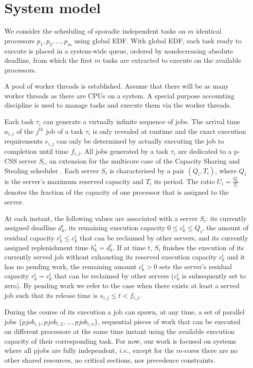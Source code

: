 \documentclass[10pt,twocolumn]{article}
\begin{document}
\section{System model}

We consider the scheduling of sporadic independent tasks on $m$ identical processors ${p_1, p_2, \ldots, p_m}$ using global EDF. With global EDF, each task ready to execute is placed in a system-wide queue, ordered by nondecreasing absolute deadline, from which the first $m$ tasks are extracted to execute on the available processors. 

A pool of worker threads is established. Assume that there will be as many worker threads as there are CPUs on a system. A special purpose accounting discipline is used to manage tasks and execute them via the worker threads.

Each task $\tau_i$ can generate a virtually infinite sequence of jobs. The arrival time $a_{i,j}$ of the $j^{th}$ job of a task $\tau_i$ is only revealed at runtime and the exact execution requirements $e_{i,j}$ can only be determined by actually executing the job to completion until time $f_{i,j}$. All jobs generated by a task $\tau_i$ are dedicated to a p-CSS server $S_i$, an extension for the multicore case of the Capacity Sharing and Stealing scheduler \cite{luisJSA10}. Each server $S_i$ is characterised by a pair $(Q_i,T_i)$, where $Q_i$ is the server's maximum reserved capacity and $T_i$ its period. The ratio $U_i = \frac{Q_i}{T_i}$ denotes the fraction of the capacity of one processor that is assigned to the server. 

At each instant, the following values are associated with a server $S_i$: its currently assigned deadline $d^i_k$, its remaining execution capacity $0 \le c^i_k \le Q_i$, the amount of residual capacity $r^i_k \le c^i_k$ that can be reclaimed by other servers, and its currently assigned replenishment time $h^i_k = d^i_k$. If at time $t$, $S_i$ finishes the execution of its currently served job without exhausting its reserved execution capacity $c^i_k$ and it has no pending work, the remaining amount $c^i_k > 0$ sets the server's residual capacity $r^i_k = c^i_k$ that can be reclaimed by other servers ($c^i_k$ is subsequently set to zero). By pending work we refer to the case when there exists at least a served job such that its release time is $s_{i,j} \le t < f_{i,j}$. 

During the course of its execution a job can spawn, at any time, a set of parallel jobs $\{pjob_{i,1},pjob_{i,2},\ldots,pjob_{i,n}\}$, sequential pieces of work that can be executed on different processors at the same time instant using the available execution capacity of their corresponding task. For now, our work is focused on systems where all pjobs are fully independent, \emph{i.e.}, except for the $m$-cores there are no other shared resources, no critical sections, nor precedence constraints.
\end{document}
